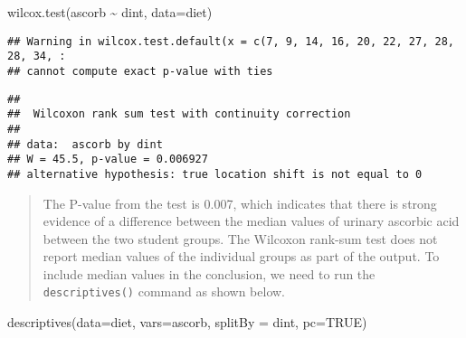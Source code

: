 \documentclass[
]{memoir}
\newenvironment{Shaded}{\begin{snugshade}}{\end{snugshade}}
\newcommand{\AttributeTok}[1]{\textcolor[rgb]{0.77,0.63,0.00}{#1}}
\newcommand{\ConstantTok}[1]{\textcolor[rgb]{0.00,0.00,0.00}{#1}}
\newcommand{\FunctionTok}[1]{\textcolor[rgb]{0.00,0.00,0.00}{#1}}
\newcommand{\NormalTok}[1]{#1}
\newcommand{\SpecialCharTok}[1]{\textcolor[rgb]{0.00,0.00,0.00}{#1}}
\begin{document}
\begin{Shaded}
\begin{Highlighting}[]
\FunctionTok{wilcox.test}\NormalTok{(ascorb }\SpecialCharTok{\textasciitilde{}}\NormalTok{ dint, }\AttributeTok{data=}\NormalTok{diet)}
\end{Highlighting}
\end{Shaded}

\begin{verbatim}
## Warning in wilcox.test.default(x = c(7, 9, 14, 16, 20, 22, 27, 28, 28, 34, :
## cannot compute exact p-value with ties
\end{verbatim}

\begin{verbatim}
## 
##  Wilcoxon rank sum test with continuity correction
## 
## data:  ascorb by dint
## W = 45.5, p-value = 0.006927
## alternative hypothesis: true location shift is not equal to 0
\end{verbatim}

\begin{quote}
The P-value from the test is 0.007, which indicates that there is strong evidence of a difference between the median values of urinary ascorbic acid between the two student groups. The Wilcoxon rank-sum test does not report median values of the individual groups as part of the output. To include median values in the conclusion, we need to run the \texttt{descriptives()} command as shown below.
\end{quote}

\begin{Shaded}
\begin{Highlighting}[]
\FunctionTok{descriptives}\NormalTok{(}\AttributeTok{data=}\NormalTok{diet, }\AttributeTok{vars=}\NormalTok{ascorb, }\AttributeTok{splitBy =}\NormalTok{ dint,}
          \AttributeTok{pc=}\ConstantTok{TRUE}\NormalTok{)   }
\end{Highlighting}
\end{Shaded}
\end{document}
